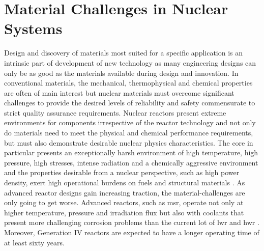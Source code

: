 \section{Material Challenges in Nuclear Systems}
	Design and discovery of materials most suited for a specific application is an intrinsic part of development of new technology as many engineering designs can only be as good as the materials available during design and innovation. In conventional materials, the mechanical, thermophysical and chemical properties are often of main interest but nuclear materials must overcome significant challenges to provide the desired levels of reliability and safety commensurate to strict quality assurance requirements. Nuclear reactors present extreme environments for components irrespective of the reactor technology and not only do materials need to meet the physical and chemical performance requirements, but must also demonstrate desirable nuclear physics characteristics. The core in particular presents an exceptionally harsh environment of high temperature, high pressure, high stresses, intense radiation and a chemically aggressive environment and the properties desirable from a nuclear perspective, such as high power density, exert high operational burdens on fuels and structural materials \cite{Zinkle:2013aa}.  As advanced reactor designs gain increasing traction, the material-challenges are only going to get worse. Advanced reactors, such as \gls{msr}, operate not only at higher temperature, pressure and irradiation flux but also with coolants that present more challenging corrosion problems than the current lot of \gls{lwr} and \gls{hwr} \cite{Allen:2010aa}. Moreover, Generation {IV}  reactors are expected to have a longer operating time of at least sixty years.
 
